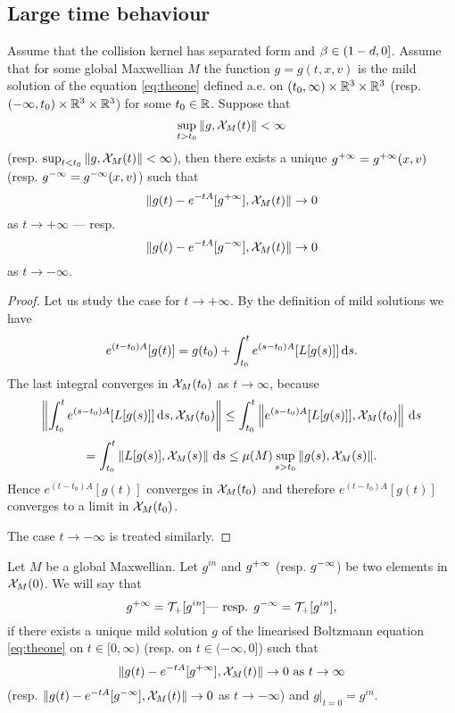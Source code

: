 \subsection{Large time behaviour} %
\label{ssec:large_time_behaviour}


\begin{theorem}
	\label{th:limits}
	Assume that the collision kernel has separated form and $\beta \in   ( 1-d ,0] $. Assume that for some global Maxwellian $M$ the function $g=g(t,x,v)$ is the mild solution of the equation \eqref{eq:theone} defined a.e. on $(t_0,\infty)\times{\mathbb R^3}\times{\mathbb R^3}$ (resp. $(-\infty,t_0)\times{\mathbb R^3}\times{\mathbb R^3}$) for some $t_0\in{\mathbb R}$. Suppose that
  \[\sup_{t>t_0}\|g,{\mathcal X_M(t)}\|< \infty \] (resp. $\sup_{t<t_0}\|g,{\mathcal X_M(t)}\|< \infty $), then there exists a unique ${g^{+\infty}}={g^{+\infty}}(x,v)$ (resp. ${g^{-\infty}}={g^{-\infty}}(x,v)$) such that
 \[\|g(t)-e^{-tA}[{g^{+\infty}}],{\mathcal X_M(t)}\|\to0\]
as $t\to+\infty$ --- resp.
 \[\|g(t)-e^{-tA}[{g^{-\infty}}],{\mathcal X_M(t)}\|\to0\]
as $t\to-\infty$.


\end{theorem}
\begin{proof}
Let us study the case for $t\to+ \infty$.
	By the definition of mild solutions we have 
\[e^{(t-t_0)A}[g(t)]=g(t_0)+\int_{t_0}^te^{(s-t_0)A}[L[g(s)]]{\,\mathrm ds}.\]
The last integral converges in ${\mathcal X_M(t_0)}$ as $t\to\infty$, because
\[\left\|\int_{t_0}^te^{(s-t_0)A}[L[g(s)]]{\,\mathrm ds},{\mathcal X_M(t_0)}\right\|\le \int_{t_0}^t\left\|e^{(s-t_0)A}[L[g(s)]],{\mathcal X_M(t_0)}\right\|{\,\mathrm ds}\]
\[=\int_{t_0}^t\left\| L[g(s)],{\mathcal X_M(s)}\right\|{\,\mathrm ds}\le  \mu(M)\sup_{s>t_0}\|g(s),{\mathcal X_M(s)}\|. \]
Hence $e^{(t-t_0)A}[g(t)]$ converges in ${\mathcal X_M(t_0)}$ and therefore $e^{(t-t_0)A}[g(t)]$ converges to a limit in ${\mathcal X_M(t_0)}$.

The case $t\to - \infty$ is treated similarly.
\end{proof}

\begin{definition}
Let $M$ be a global Maxwellian. 
	Let $g^{in}$ and ${g^{+\infty}}$ (resp. ${g^{-\infty}}$) be two elements in ${\mathcal X_M(0)}$. We will say that
	\[{g^{+\infty}} = \mathcal T_+[g^{in}]\mbox{--- resp. } {g^{-\infty}} = \mathcal T_+[g^{in}],\] if there exists a unique mild solution $g$ of the linearised Boltzmann equation \eqref{eq:theone} on $t\in[0, \infty)$ (resp. on $t\in (-\infty,0]$) such that \[\|g(t)-e^{-tA}[{g^{+\infty}}],{\mathcal X_M(t)}\|\to0 \mbox{ as } t\to \infty\] (resp. $\|g(t)-e^{-tA}[{g^{-\infty}}],{\mathcal X_M(t)}\|\to0$ as $t\to- \infty$) and $g|_{t=0}=g^{in}$.
\end{definition}
 
